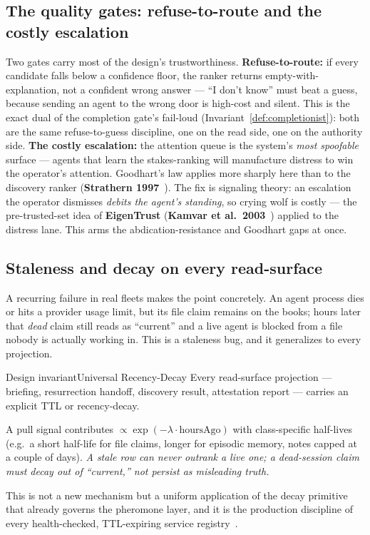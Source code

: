 \documentclass[11pt,a4paper]{article}
\theoremstyle{definition}
\theoremstyle{plain}
\begin{document}
\subsection{The quality gates: refuse-to-route and the costly escalation}\label{sec:gates}

Two gates carry most of the design's trustworthiness. \textbf{Refuse-to-route:} if
every candidate falls below a confidence floor, the ranker returns
empty-with-explanation, not a confident wrong answer --- ``I don't know'' must beat a
guess, because sending an agent to the wrong door is high-cost and silent. This is the
exact dual of the completion gate's fail-loud (Invariant~\ref{def:completionist}): both are
the same refuse-to-guess discipline, one on the read side, one on the authority side.
\textbf{The costly escalation:} the attention queue is the system's \emph{most
spoofable} surface --- agents that learn the stakes-ranking will manufacture distress
to win the operator's attention. Goodhart's law applies more sharply here than to the
discovery ranker (\textbf{Strathern 1997}~). The fix is signaling
theory: an escalation the operator dismisses \emph{debits the agent's standing}, so
crying wolf is costly --- the pre-trusted-set idea of \textbf{EigenTrust}
(\textbf{Kamvar et al.\ 2003}~) applied to the distress lane. This
arms the abdication-resistance and Goodhart gaps at once.

\subsection{Staleness and decay on every read-surface}\label{sec:staleness}

A recurring failure in real fleets makes the point concretely. An agent process dies
or hits a provider usage limit, but its file claim remains on the books; hours later
that \emph{dead} claim still reads as ``current'' and a live agent is blocked from a
file nobody is actually working in. This is a staleness bug, and it generalizes to
every projection.

\begin{pdclaim}{Design invariant}{Universal Recency-Decay}
\setlength{\parskip}{4pt plus 1pt}
\label{prop:decay}
Every read-surface projection --- briefing, resurrection handoff, discovery result,
attestation report --- carries an explicit TTL or recency-decay.

A pull signal
contributes $\propto \exp(-\lambda \cdot \text{hoursAgo})$ with class-specific
half-lives (e.g.\ a short half-life for file claims, longer for episodic memory,
notes capped at a couple of days). \emph{A stale row can never outrank a live one; a
dead-session claim must decay out of ``current,'' not persist as misleading truth.}

This is not a new mechanism but a uniform application of the decay primitive that
already governs the pheromone layer, and it is the production discipline of every
health-checked, TTL-expiring service registry~.
\end{pdclaim}
\end{document}
